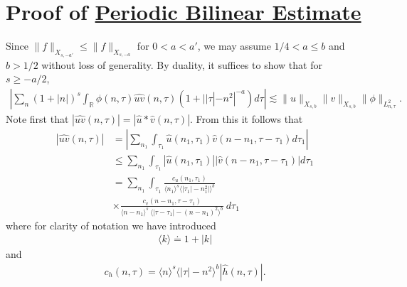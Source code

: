 \documentclass[12pt,reqno]{amsart}
\numberwithin{equation}{section}  %
\newcommand{\rr}{\mathbb{R}}
\newcommand{\wh}{\widehat}
\begin{document}
\section{Proof of \hyperref[prop:bilinear-est]{Periodic Bilinear Estimate}} 
\label{sec:proof-bilin-est}
Since $\|f\|_{X_{s,-a'}} \le \|f\|_{X_{s, -a}}$ for $0 < a < a'$, we may assume
$1/4 < a \le b$ and $b > 1/2$ without loss of generality.
By duality, it suffices to show that for $s \ge -a/2$, 
%
\begin{equation}
	\label{duality-est}
	\begin{split}
	|	\sum_{n}  (1 + |n|)^{s}
		\int_{\rr} \phi(n, \tau) \wh{uv}(n, \tau)(1 
    + | |\tau| - n^{2} |^{-a}) d \tau | \lesssim \|u\|_{X_{s,b}}
    \|v\|_{X_{s,b}}
    \|\phi \|_{L^{2}_{n, \tau}}.
	\end{split}
\end{equation}
Note first that $|\wh{uv}(n, \tau) |  = | \wh{u} *  \wh{v} 
(n, \tau)|$. From this it follows that
%
%
\begin{equation}
	\label{non-lin-rep}
	\begin{split}
		| \wh{uv}(n, \tau)|
    & = | \sum_{n_{1}}  \int_{\tau_{1}}
    \wh{u}\left( n_1,  \tau_1 \right) \wh{v}\left( n - n_1 , \tau - \tau_1   
\right) d \tau_1 |
\\
& \le  \sum_{n_{1}}  \int_{\tau_{1}}
    |\wh{u}\left( n_1,  \tau_1 \right)| |\wh{v}\left( n - n_1 , \tau - \tau_1   
\right)| d \tau_1 
\\
& = \sum_{n_{1}} \int_{\tau_{1}} \frac{c_u\left( n_1, \tau_1 
\right)}{\langle n_1 \rangle ^s \langle |\tau_1| - n_1^{2} | \rangle ^{b}}
\\
& \times \frac{c_{v}\left( n - n_1, \tau - \tau_1 \right)}{\langle n -
n_1 \rangle ^s\ \langle |\tau - \tau_1 | -  (n - n_1)^{2} \rangle^{b}}
  \ d \tau_1 
\end{split}
\end{equation}
%
%
where for clarity of notation we have introduced 
%
%
%
\begin{equation*}
\begin{split}
\langle k \rangle \doteq 1 + |k|
\end{split}
\end{equation*}
%
%
and
%
\begin{equation*}
	\begin{split}
		c_h(n, \tau) =
			\langle n \rangle ^s \langle |\tau| - n^{2} \rangle ^{b} | \wh{h}\left( n, \tau \right) |.
	\end{split}
\end{equation*}
\end{document}
